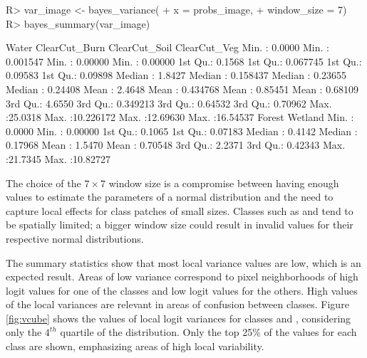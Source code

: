 \documentclass[
  shortnames]{jss}
\begin{document}
\begin{CodeChunk}
\begin{CodeInput}
R> var_image <- bayes_variance(
+     x = probs_image,
+     window_size = 7)
R> bayes_summary(var_image)
\end{CodeInput}
\begin{CodeOutput}
 Water             ClearCut_Burn       ClearCut_Soil      ClearCut_Veg      
 Min.   : 0.0000   Min.   : 0.001547   Min.   : 0.00000   Min.   : 0.00000  
 1st Qu.: 0.1568   1st Qu.: 0.067745   1st Qu.: 0.09583   1st Qu.: 0.09898  
 Median : 1.8427   Median : 0.158437   Median : 0.23655   Median : 0.24408  
 Mean   : 2.4648   Mean   : 0.434768   Mean   : 0.85451   Mean   : 0.68109  
 3rd Qu.: 4.6550   3rd Qu.: 0.349213   3rd Qu.: 0.64532   3rd Qu.: 0.70962  
 Max.   :25.0318   Max.   :10.226172   Max.   :12.69630   Max.   :16.54537  
 Forest            Wetland           
 Min.   : 0.0000   Min.   : 0.00000  
 1st Qu.: 0.1065   1st Qu.: 0.07183  
 Median : 0.4142   Median : 0.17968  
 Mean   : 1.5470   Mean   : 0.70548  
 3rd Qu.: 2.2371   3rd Qu.: 0.42343  
 Max.   :21.7345   Max.   :10.82727  
\end{CodeOutput}
\end{CodeChunk}

The choice of the \(7 \times 7\) window size is a compromise between having enough values to
estimate the parameters of a normal distribution and the need to capture local effects
for class patches of small sizes. Classes such as  and 
tend to be spatially limited; a bigger window size could result in invalid values for
their respective normal distributions.

The summary statistics show that most local variance values are low, which is an expected result. Areas of low variance correspond to pixel neighborhoods of high logit values for one of the classes and low logit values for the others. High values of the local variances are relevant in areas of confusion between classes. Figure \ref{fig:vcube} shows the values of local logit variances for classes  and , considering only the \(4^{th}\) quartile of the distribution. Only the top 25\% of the values for each class are shown, emphasizing areas of high local variability.
\end{document}
